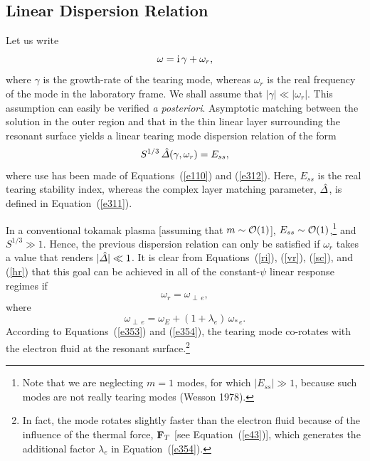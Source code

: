 \documentclass[notitlepage,12pt]{article}
\begin{document}
\subsection{Linear Dispersion Relation}\label{s6.2}
Let us write
\begin{equation}\label{e350}
\omega = {\rm i}\,\gamma+\omega_r,
\end{equation}
where $\gamma$ is the growth-rate of the tearing mode, whereas $\omega_r$ is the real
frequency of the mode in the laboratory frame. We shall assume that $|\gamma|\ll |\omega_r|$. This assumption can
easily be verified {\em a posteriori}. Asymptotic matching between the solution in the outer region and that in the
thin linear layer surrounding the resonant surface yields a linear tearing mode dispersion relation of the form
\begin{equation}\label{e352}
S^{1/3}\,\hat{\mit\Delta}(\gamma,\omega_r) = E_{ss},
\end{equation}
where use has been made of Equations~(\ref{e110}) and (\ref{e312}). Here, $E_{ss}$ is the real tearing stability index, 
whereas the complex layer matching parameter, $\hat{\mit\Delta}$, is defined in Equation~(\ref{e311}). 

In a conventional tokamak plasma [assuming that $m\sim {\cal O}(1)$], $E_{ss}\sim {\cal O}(1)$,\footnote{Note that we are neglecting $m=1$ modes, for which $|E_{ss}|\gg 1$,
because such modes are not really tearing modes
(Wesson 1978).} and $S^{1/3}\gg 1$. Hence, the previous dispersion relation can only be satisfied if $\omega_r$ takes a
value that renders $|\hat{\mit\Delta}|\ll 1$. It is clear from Equations~(\ref{ri}), (\ref{vr}), (\ref{sc}), and (\ref{hr}) that this goal
can be achieved in all of the constant-$\psi$ linear response regimes if
\begin{equation}\label{e353}
\omega_r = \omega_{\perp\,e},
\end{equation}
where
\begin{equation}\label{e354}
\omega_{\perp\,e} = \omega_E+(1+\lambda_e)\,\omega_{\ast\,e}.
\end{equation}
According to Equations~(\ref{e353}) and (\ref{e354}), the tearing mode co-rotates with the electron fluid at the resonant
 surface.\footnote{In fact, the mode 
rotates slightly faster than the electron fluid because of the influence of the thermal force, ${\bf F}_T$ [see Equation~(\ref{e43})],
which generates the additional  factor $\lambda_e$ in Equation~(\ref{e354}).}
\end{document}
